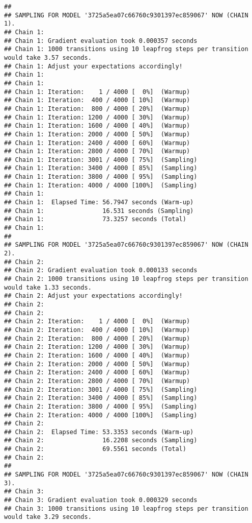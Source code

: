 \documentclass{article}\usepackage[]{graphicx}\usepackage[]{color}
\makeatletter
\newenvironment{kframe}{%
 \def\at@end@of@kframe{}%
 \ifinner\ifhmode%
  \def\at@end@of@kframe{\end{minipage}}%
  \begin{minipage}{\columnwidth}%
 \fi\fi%
 \def\FrameCommand##1{\hskip\@totalleftmargin \hskip-\fboxsep
 \colorbox{shadecolor}{##1}\hskip-\fboxsep
     \hskip-\linewidth \hskip-\@totalleftmargin \hskip\columnwidth}%
 \MakeFramed {\advance\hsize-\width
   \@totalleftmargin\z@ \linewidth\hsize
   \@setminipage}}%
 {\par\unskip\endMakeFramed%
 \at@end@of@kframe}
\newenvironment{knitrout}{}{} %
\makeatother
\begin{document}
\begin{knitrout}
\begin{kframe}
{\ttfamily\noindent\itshape\color{messagecolor}{\#\# Start sampling}}\begin{verbatim}
## 
## SAMPLING FOR MODEL '3725a5ea07c66760c9301397ec859067' NOW (CHAIN 1).
## Chain 1: 
## Chain 1: Gradient evaluation took 0.000357 seconds
## Chain 1: 1000 transitions using 10 leapfrog steps per transition would take 3.57 seconds.
## Chain 1: Adjust your expectations accordingly!
## Chain 1: 
## Chain 1: 
## Chain 1: Iteration:    1 / 4000 [  0%]  (Warmup)
## Chain 1: Iteration:  400 / 4000 [ 10%]  (Warmup)
## Chain 1: Iteration:  800 / 4000 [ 20%]  (Warmup)
## Chain 1: Iteration: 1200 / 4000 [ 30%]  (Warmup)
## Chain 1: Iteration: 1600 / 4000 [ 40%]  (Warmup)
## Chain 1: Iteration: 2000 / 4000 [ 50%]  (Warmup)
## Chain 1: Iteration: 2400 / 4000 [ 60%]  (Warmup)
## Chain 1: Iteration: 2800 / 4000 [ 70%]  (Warmup)
## Chain 1: Iteration: 3001 / 4000 [ 75%]  (Sampling)
## Chain 1: Iteration: 3400 / 4000 [ 85%]  (Sampling)
## Chain 1: Iteration: 3800 / 4000 [ 95%]  (Sampling)
## Chain 1: Iteration: 4000 / 4000 [100%]  (Sampling)
## Chain 1: 
## Chain 1:  Elapsed Time: 56.7947 seconds (Warm-up)
## Chain 1:                16.531 seconds (Sampling)
## Chain 1:                73.3257 seconds (Total)
## Chain 1: 
## 
## SAMPLING FOR MODEL '3725a5ea07c66760c9301397ec859067' NOW (CHAIN 2).
## Chain 2: 
## Chain 2: Gradient evaluation took 0.000133 seconds
## Chain 2: 1000 transitions using 10 leapfrog steps per transition would take 1.33 seconds.
## Chain 2: Adjust your expectations accordingly!
## Chain 2: 
## Chain 2: 
## Chain 2: Iteration:    1 / 4000 [  0%]  (Warmup)
## Chain 2: Iteration:  400 / 4000 [ 10%]  (Warmup)
## Chain 2: Iteration:  800 / 4000 [ 20%]  (Warmup)
## Chain 2: Iteration: 1200 / 4000 [ 30%]  (Warmup)
## Chain 2: Iteration: 1600 / 4000 [ 40%]  (Warmup)
## Chain 2: Iteration: 2000 / 4000 [ 50%]  (Warmup)
## Chain 2: Iteration: 2400 / 4000 [ 60%]  (Warmup)
## Chain 2: Iteration: 2800 / 4000 [ 70%]  (Warmup)
## Chain 2: Iteration: 3001 / 4000 [ 75%]  (Sampling)
## Chain 2: Iteration: 3400 / 4000 [ 85%]  (Sampling)
## Chain 2: Iteration: 3800 / 4000 [ 95%]  (Sampling)
## Chain 2: Iteration: 4000 / 4000 [100%]  (Sampling)
## Chain 2: 
## Chain 2:  Elapsed Time: 53.3353 seconds (Warm-up)
## Chain 2:                16.2208 seconds (Sampling)
## Chain 2:                69.5561 seconds (Total)
## Chain 2: 
## 
## SAMPLING FOR MODEL '3725a5ea07c66760c9301397ec859067' NOW (CHAIN 3).
## Chain 3: 
## Chain 3: Gradient evaluation took 0.000329 seconds
## Chain 3: 1000 transitions using 10 leapfrog steps per transition would take 3.29 seconds.

\end{verbatim}
\end{kframe}
\end{knitrout}
\end{document}
